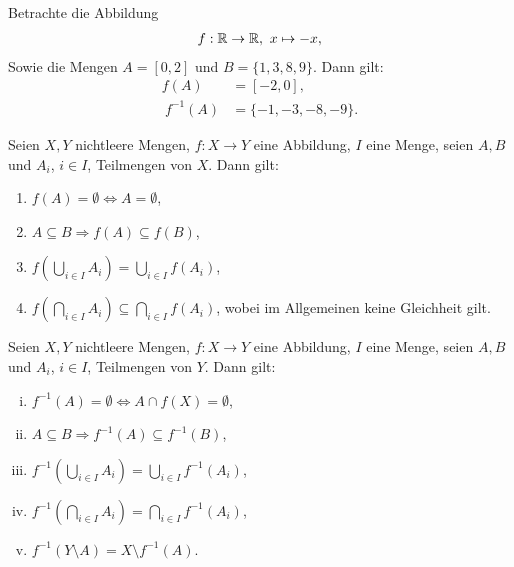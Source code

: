 \begin{example}
    Betrachte die Abbildung 
    \begin{align*}
        f: \mathbb{R} \to \mathbb{R}, \ x \mapsto -x,
    \end{align*}
    Sowie die Mengen $A = [0,2]$ und $B = \{1,3,8,9\}$. Dann gilt: 
    \begin{align*}
        f(A) &= [-2,0], \\\
        f^{-1}(A) &= \{-1, -3,-8,-9\}. 
    \end{align*}
\end{example}

\begin{theorem}
    Seien $X,Y$ nichtleere Mengen, $f:X \to Y$ eine Abbildung, $I$ eine Menge, seien $A,B$ und $A_i$, $i \in I$, Teilmengen von $X$. Dann gilt: 
    \begin{enumerate}
        \item
        $f(A) = \emptyset \iff A = \emptyset$, 
        \item 
        $A \subseteq B \Rightarrow f(A) \subseteq f(B)$,
        \item 
        $ f(\bigcup_{i \in I}A_i) = \bigcup_{i \in I}f(A_i)$,
        \item 
        $ f(\bigcap_{i \in I}A_i) \subseteq \bigcap_{i \in I}f(A_i)$, wobei im Allgemeinen keine Gleichheit gilt. 
    \end{enumerate}
\end{theorem}

\begin{proof*}
\end{proof*}

\begin{theorem}
    Seien $X,Y$ nichtleere Mengen, $f:X \to Y$ eine Abbildung, $I$ eine Menge, seien $A,B$ und $A_i$, $i \in I$, Teilmengen von $Y$. Dann gilt: 
    \begin{enumerate}[(i)]
        \item 
        $f^{-1}(A) = \emptyset \iff A \cap f(X) = \emptyset$,
        \item 
        $A \subseteq B \Rightarrow f^{-1}(A) \subseteq f^{-1}(B)$,
        \item 
        $f^{-1}(\bigcup_{i \in I}A_i) = \bigcup_{i \in I}f^{-1}(A_i)$,
        \item 
        $f^{-1}(\bigcap_{i \in I}A_i) = \bigcap_{i \in I}f^{-1}(A_i)$,
        \item 
        $f^{-1}(Y \setminus A) = X \setminus f^{-1}(A)$.
    \end{enumerate}
\end{theorem}

\begin{proof*}
\end{proof*}

